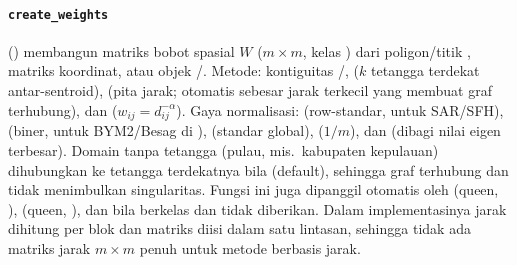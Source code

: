 \paragraph{\texttt{create\_weights}} () membangun
matriks bobot spasial $W$ ($m\times m$, kelas ) dari
poligon/titik , matriks koordinat, atau objek /.
Metode: kontiguitas /,  ($k$ tetangga
terdekat antar-sentroid),  (pita jarak;  otomatis
sebesar jarak terkecil yang membuat graf terhubung), dan 
($w_{ij}=d_{ij}^{-\alpha}$). Gaya normalisasi:  (row-standar, untuk
SAR/SFH),  (biner, untuk BYM2/Besag di ),  (standar
global),  ($1/m$), dan  (dibagi nilai eigen terbesar).
Domain tanpa tetangga (pulau, mis.\ kabupaten kepulauan) dihubungkan ke
 tetangga terdekatnya bila 
(default), sehingga graf terhubung dan tidak menimbulkan singularitas.
Fungsi ini juga dipanggil otomatis oleh  (queen, ),
 (queen, ), dan  bila 
berkelas  dan  tidak diberikan. Dalam implementasinya jarak
dihitung per blok dan matriks diisi dalam satu lintasan, sehingga tidak ada
matriks jarak $m\times m$ penuh untuk metode berbasis jarak.

